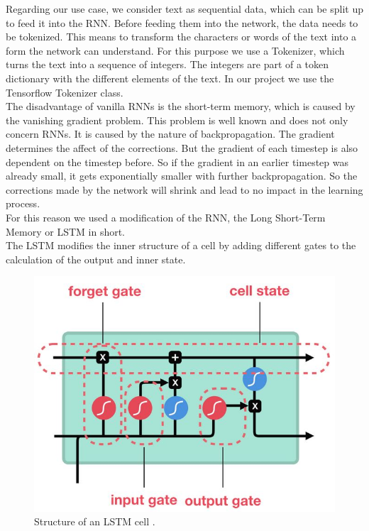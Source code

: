 \documentclass[conference]{IEEEtran}
\begin{document}
Regarding our use case, we consider text as sequential data, which can be split up to feed it into the RNN. Before feeding them into the network, the data needs to be tokenized. This means to transform the characters or words of the text into a form the network can understand. For this purpose we use a Tokenizer, which turns the text into a sequence of integers. The integers are part of a token dictionary with the different elements of the text. In our project we use the Tensorflow Tokenizer class.\\
The disadvantage of vanilla RNNs is the short-term memory, which is caused by the vanishing gradient problem. This problem is well known and does not only concern RNNs. It is caused by the nature of backpropagation. The gradient determines the affect of the corrections. But the gradient of each timestep is also dependent on the timestep before. So if the gradient in an earlier timestep was already small, it gets exponentially smaller with further backpropagation. So the corrections made by the network will shrink and lead to no impact in the learning process.\\
For this reason we used a modification of the RNN, the Long Short-Term Memory or LSTM in short.\\
The LSTM modifies the inner structure of a cell by adding different gates to the calculation of the output and inner state.

\begin{figure}[htbp]
\centerline{\includegraphics[scale=0.5]{pictures/structure_lstm.png}}
\caption{Structure of an LSTM cell \cite{tim3}.}
\label{fig:structure_lstm}
\end{figure}
\end{document}
